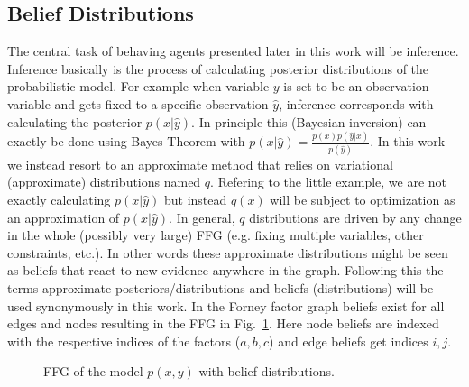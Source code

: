 \subsection{Belief Distributions}
The central task of behaving agents presented later in this work will be inference. Inference basically is the process of calculating posterior distributions of the probabilistic model. For example when variable \(y\) is set to be an observation variable and gets fixed to a specific observation \(\hat{y}\), inference corresponds with calculating the posterior \(p(x|\hat{y})\). In principle this (Bayesian inversion) can exactly be done using Bayes Theorem with \(p(x|\hat{y}) = \frac{p(x)p(\hat{y}|x)}{p(\hat{y})}\). In this work we instead resort to an approximate method that relies on variational (approximate) distributions named \(q\). Refering to the little example, we are not exactly calculating \(p(x|\hat{y})\) but instead \(q(x)\) will be subject to optimization as an approximation of \(p(x|\hat{y})\). In general, \(q\) distributions are driven by any change in the whole (possibly very large) FFG (e.g. fixing multiple variables, other constraints, etc.). In other words these approximate distributions might be seen as beliefs that react to new evidence anywhere in the graph. Following this the terms approximate posteriors/distributions and beliefs (distributions) will be used synonymously in this work. In the Forney factor graph beliefs exist for all edges and nodes resulting in the FFG in Fig.~\ref{fig:4}. Here node beliefs are indexed with the respective indices of the factors (\(a,b,c\)) and edge beliefs get indices \(i,j\).
\begin{figure}[htbp]
    \centering


    \caption{FFG of the model \(p(x,y)\) with belief distributions.}
    \label{fig:4}
\end{figure}
